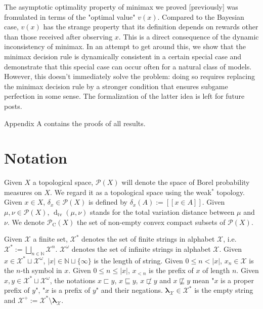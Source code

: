 \documentclass[a4paper]{article}
\newcommand{\Dtv}{\operatorname{d}_{\text{tv}}}
\newcommand{\Nats}{\mathbb{N}}
\newcommand{\Estr}{\boldsymbol{\lambda}}
\newcommand{\Abs}[1]{\lvert #1 \rvert}
\newcommand{\Prob}{\mathcal{P}}
\newcommand{\CC}{\mathcal{P}_{\operatorname{C}}}
\begin{document}
The asymptotic optimality property of minimax we proved [previously] was fromulated in terms of the "optimal value" ${v(x)}$. Compared to the Bayesian case, ${v(x)}$ has the strange property that its definition depends on rewards other than those received after observing ${x}$. This is a direct consequence of the dynamic inconsistency of minimax. In an attempt to get around this, we show that the minimax decision rule is dynamically consistent in a certain special case and demonstrate that this special case can occur often for a natural class of models. However, this doesn't immediately solve the problem: doing so requires replacing the minimax decision rule by a stronger condition that ensures subgame perfection in some sense. The formalization of the latter idea is left for future posts.

Appendix A contains the proofs of all results.

\section{Notation}

Given ${X}$ a topological space, ${\Prob(X)}$ will denote the space of Borel probability measures on ${X}$. We regard it as a topological space using the weak${^*}$ topology. Given ${x \in X}$, ${\delta_x \in \Prob(X)}$ is defined by ${\delta_x(A):=[[x \in A]]}$. Given ${\mu, \nu \in \Prob(X)}$, ${\Dtv(\mu, \nu)}$ stands for the total variation distance between ${\mu}$ and ${\nu}$. We denote ${\CC(X)}$ the set of non-empty convex compact subsets of ${\Prob(X)}$.

Given ${\mathcal{X}}$ a finite set, ${\mathcal{X}^*}$ denotes the set of finite strings in alphabet ${\mathcal{X}}$, i.e. ${\mathcal{X}^*:=\bigsqcup_{n \in \Nats} \mathcal{X}^n}$. ${\mathcal{X}^\omega}$ denotes the set of infinite strings in alphabet ${\mathcal{X}}$. Given ${x \in \mathcal{X}^* \sqcup \mathcal{X}^\omega}$, ${\Abs{x} \in \Nats \sqcup \{\infty\}}$ is the length of string. Given ${0 \leq n < \Abs{x}}$, ${x_n \in \mathcal{X}}$ is the ${n}$-th symbol in ${x}$. Given ${0 \leq n \leq \Abs{x}}$, ${x_{<n}}$ is the prefix of ${x}$ of length ${n}$. Given ${x,y \in \mathcal{X}^* \sqcup \mathcal{X}^\omega}$, the notations ${x \sqsubset y}$, ${x \sqsubseteq y}$, ${x \not\sqsubset y}$ and ${x \not\sqsubseteq y}$ mean "${x}$ is a proper prefix of ${y}$", "${x}$ is a prefix of ${y}$" and their negations. ${\Estr_\mathcal{X} \in \mathcal{X}^*}$ is the empty string and ${\mathcal{X}^{+}:=\mathcal{X}^* \setminus \Estr_\mathcal{X}}$.
\end{document}
